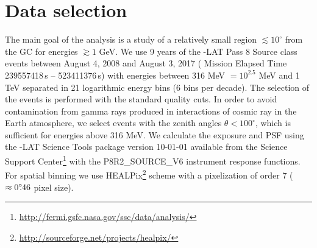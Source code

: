 \section{Data selection}

The main goal of the analysis is a study of a relatively small region $\lesssim 10^\circ$ from the GC for energies $\gtrsim 1$ GeV.
We use 9 years of the \Fermi-LAT Pass 8 Source class events
between August 4, 2008  and August 3, 2017 ({\Fermi} Mission Elapsed Time 239557418\,s -- 523411376\,s)
with energies between 316 MeV $ = 10^{2.5}$ MeV
and 1 TeV separated in 21 logarithmic energy bins (6 bins per decade).
The selection of the events is performed with the standard quality cuts.
In order to avoid contamination from gamma rays produced in interactions of cosmic ray in the Earth atmosphere, 
we select events with the zenith angles $\theta < 100^{\circ}$,
which is sufficient for energies above 316 MeV.
We calculate the exposure and PSF using the {\Fermi}-LAT Science Tools package version 
10-01-01 available from the {\Fermi} Science Support Center\footnote{\url{http://fermi.gsfc.nasa.gov/ssc/data/analysis/}} 
with the P8R2\_SOURCE\_V6 instrument response functions.
For spatial binning we use HEALPix\footnote{\url{http://sourceforge.net/projects/healpix/}} \citep{2005ApJ...622..759G} scheme with a pixelization of order 7  ($\approx 0^\circ\!\!.46$ pixel size). 